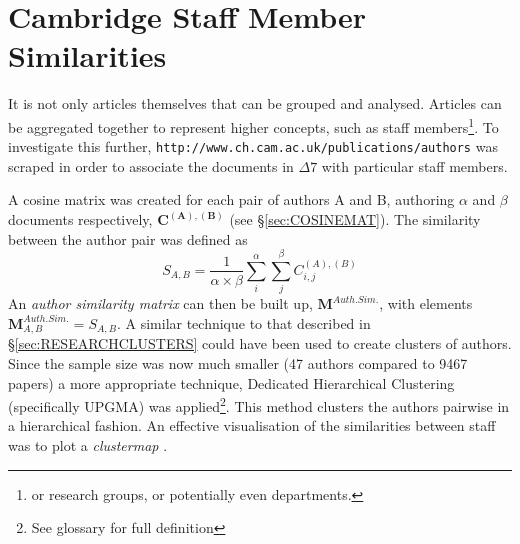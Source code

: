 \section{Cambridge Staff Member Similarities}
\label{sec:AUTHORCLUSTERS}

It is not only articles themselves that can be grouped and analysed. Articles can be aggregated together to represent higher concepts, such as staff members\footnote{or research groups, or potentially even departments. }. To investigate this further, \texttt{http://www.ch.cam.ac.uk/publications/authors} was scraped in order to associate the documents in $\Delta7$ with particular staff members.

A cosine matrix was created for each pair of authors A and B, authoring $\alpha$ and $\beta$ documents respectively, $\mathbf{C^{\left( A \right ) , \left( B \right)}}$ (see \S\ref{sec:COSINEMAT}). The similarity between the author pair was defined as 
$$S_{A , B} = \frac{1}{\alpha \times \beta} \sum_{i}^{\alpha} \sum_{j}^{\beta} C^{\left( A \right) , \left( B \right) }_{ i , j }$$
An \emph{author similarity matrix} can then be built up, $\mathbf{M}^{Auth. Sim.}$, with elements $\mathbf{M}^{Auth. Sim.}_{ A , B }=S_{ A , B }$.
A similar technique to that described in  \S\ref{sec:RESEARCHCLUSTERS} could have been used to create clusters of authors. Since the sample size was now much smaller (47 authors compared to 9467 papers) a more appropriate technique, Dedicated Hierarchical Clustering (specifically UPGMA) was applied\cite{heatmapcluster}\footnote{See glossary for full definition}. This method clusters the authors pairwise in a hierarchical fashion.  An effective visualisation of the similarities between staff was to plot a \emph{clustermap} \cite{seaborn}\cite{scipy}.
